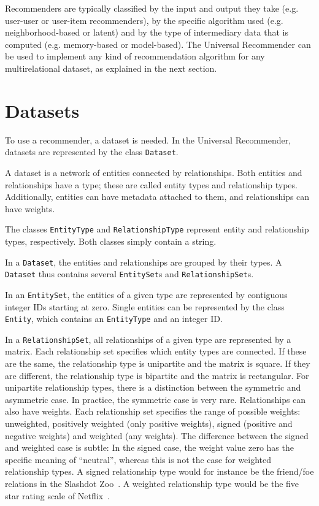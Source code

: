 \documentclass{article}
\begin{document}
Recommenders are typically classified by the input and output they take
(e.g. user-user or user-item recommenders), by the specific algorithm
used (e.g. neighborhood-based or latent) and by the type of intermediary
data that is computed (e.g. memory-based or model-based).
The Universal Recommender can be used to implement any kind of
recommendation algorithm for any multirelational dataset, as explained
in the next section. 

\section{Datasets}
To use a recommender, a dataset is needed.  In the Universal
Recommender, datasets are represented by the class \texttt{Dataset}.   

A dataset is a network of entities connected by relationships.  Both
entities and relationships have a type; these are called entity types
and relationship types.
Additionally, entities can have metadata attached to them, and
relationships can have weights. 

The classes \texttt{EntityType} and \texttt{RelationshipType} represent
entity and relationship types, respectively.  Both classes simply
contain a string.

In a \texttt{Dataset}, the entities and relationships are grouped by
their types.  A \texttt{Dataset} thus contains several
\texttt{EntitySet}s and \texttt{RelationshipSet}s.  

In an \texttt{EntitySet}, the entities of a given type are represented
by contiguous integer IDs starting at zero.  Single entities can be
represented by the class \texttt{Entity}, which contains an
\texttt{EntityType} and an integer ID. 

In a \texttt{RelationshipSet}, all relationships of a given type are
represented by a matrix.  Each relationship set specifies which entity
types are connected.  If these are the same, the relationship type is
unipartite and the matrix is square.  If they are different, the
relationship type is bipartite and the matrix is rectangular.  For
unipartite relationship types, there is a distinction between the symmetric
and asymmetric case.  In practice, the symmetric case is very rare. 
Relationships can also have weights.  Each relationship set specifies
the range of possible weights:  unweighted, positively weighted (only
positive weights), signed (positive and negative weights) and weighted
(any weights).  The difference between the signed and weighted case is
subtle:  In the signed case, the weight value zero has the specific
meaning of ``neutral'', whereas this is not the case for weighted
relationship types.  A signed relationship type would for instance be
the friend/foe relations in the Slashdot
Zoo~\cite{kunegis:slashdot-zoo}.  A weighted relationship type would be
the five star rating scale of Netflix~\cite{b520}.
\end{document}
